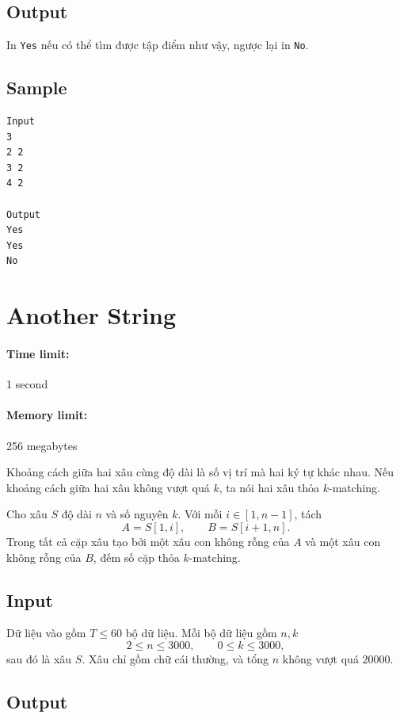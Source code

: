 \documentclass[11pt]{article}
\begin{document}
\subsection*{Output}

In \texttt{Yes} nếu có thể tìm được tập điểm như vậy, ngược lại in \texttt{No}.

\subsection*{Sample}

\begin{verbatim}
Input
3
2 2
3 2
4 2

Output
Yes
Yes
No
\end{verbatim}

\section{Another String}

\paragraph{Time limit:} 1 second
\paragraph{Memory limit:} 256 megabytes

Khoảng cách giữa hai xâu cùng độ dài là số vị trí mà hai ký tự khác nhau. Nếu
khoảng cách giữa hai xâu không vượt quá \(k\), ta nói hai xâu thỏa
\(k\)-matching.

Cho xâu \(S\) độ dài \(n\) và số nguyên \(k\). Với mỗi \(i\in[1,n-1]\), tách
\[
  A=S[1,i],\qquad B=S[i+1,n].
\]
Trong tất cả cặp xâu tạo bởi một xâu con không rỗng của \(A\) và một xâu con
không rỗng của \(B\), đếm số cặp thỏa \(k\)-matching.

\subsection*{Input}

Dữ liệu vào gồm \(T\le 60\) bộ dữ liệu. Mỗi bộ dữ liệu gồm \(n,k\)
\[
  2\le n\le 3000,\qquad 0\le k\le 3000,
\]
sau đó là xâu \(S\). Xâu chỉ gồm chữ cái thường, và tổng \(n\) không vượt quá
\(20000\).

\subsection*{Output}
\end{document}
